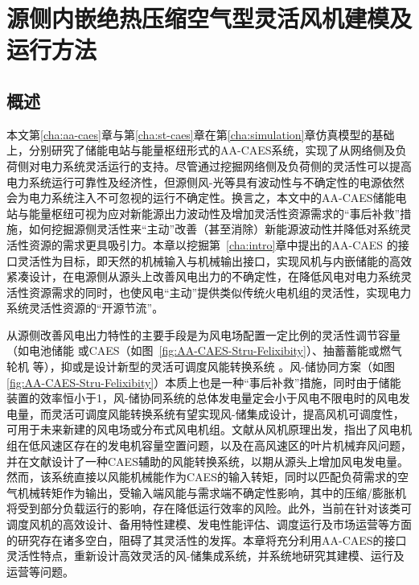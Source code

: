 \chapter{源侧内嵌绝热压缩空气型灵活风机建模及运行方法}
\label{cha:ca-recs}

\section{概述}
\label{sec:chap5-intro}
本文第\ref{cha:aa-caes}章与第\ref{cha:st-caes}章在第\ref{cha:simulation}章仿真模型的基础上，分别研究了储能电站与能量枢纽形式的AA-CAES系统，实现了从网络侧及负荷侧对电力系统灵活运行的支持。尽管通过挖掘网络侧及负荷侧的灵活性可以提高电力系统运行可靠性及经济性，但源侧风-光等具有波动性与不确定性的电源依然会为电力系统注入不可忽视的运行不确定性。换言之，本文中的AA-CAES储能电站与能量枢纽可视为应对新能源出力波动性及增加灵活性资源需求的“事后补救”措施，如何挖掘源侧灵活性来“主动”改善（甚至消除）新能源波动性并降低对系统灵活性资源的需求更具吸引力。本章以挖掘第~\ref{cha:intro}章中提出的AA-CAES 的接口灵活性为目标，即天然的机械输入与机械输出接口，实现风机与内嵌储能的高效紧凑设计，在电源侧从源头上改善风电出力的不确定性，在降低风电对电力系统灵活性资源需求的同时，也使风电“主动”提供类似传统火电机组的灵活性，实现电力系统灵活性资源的“开源节流”。

从源侧改善风电出力特性的主要手段是为风电场配置一定比例的灵活性调节容量（如电池储能
\cite{ESS-IEEE-04,WT-ESS-15}或CAES（如图~\ref{fig:AA-CAES-Stru-Felixibity}）\cite{CAES-Wind-10}、抽蓄蓄能或燃气轮机
\cite{GT-Wind-05,GT-Wind-14}等），抑或是设计新型的灵活可调度风能转换系统
\cite{Thesis-Jared-09,WT-CAES-12,WT-CAES-Fea-15,WT-CAES-Model-Exp-17}。风-储协同方案（如图\ref{fig:AA-CAES-Stru-Felixibity}）本质上也是一种“事后补救”措施，同时由于储能装置的效率恒小于1，风-储协同系统的总体发电量定会小于风电不限电时的风电发电量，而灵活可调度风能转换系统有望实现风-储集成设计，提高风机可调度性，可用于未来新建的风电场或分布式风电机组。文献从风机原理出发，指出了风电机组在低风速区存在的发电机容量空置问题，以及在高风速区的叶片机械弃风问题，并在文献设计了一种CAES辅助的风能转换系统，以期从源头上增加风电发电量。然而，该系统直接以风能机械能作为CAES的输入转矩，同时以匹配负荷需求的空气机械转矩作为输出，受输入端风能与需求端不确定性影响，其中的压缩/膨胀机将受到部分负载运行的影响，存在降低运行效率的风险。此外，当前在针对该类可调度风机的高效设计、备用特性建模、发电性能评估、调度运行及市场运营等方面的研究存在诸多空白，阻碍了其灵活性的发挥。本章将充分利用AA-CAES的接口灵活性特点，重新设计高效灵活的风-储集成系统，并系统地研究其建模、运行及运营等问题。%

